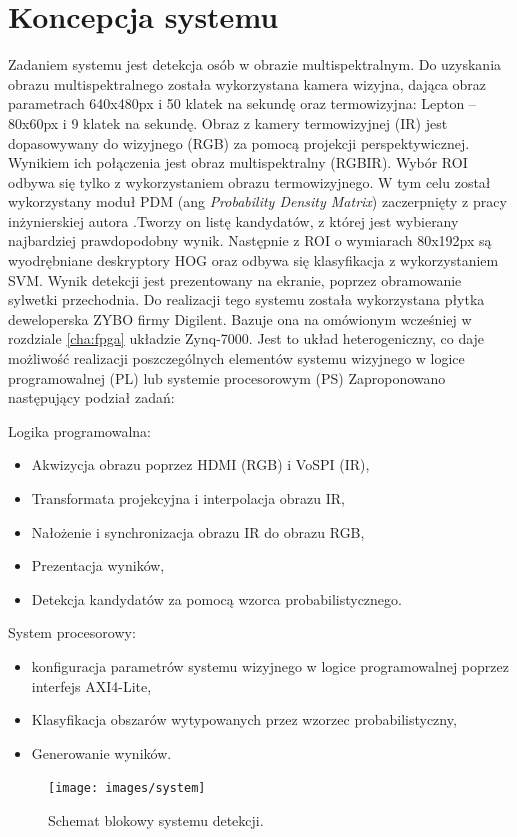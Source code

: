 \section{Koncepcja systemu}
Zadaniem systemu jest detekcja osób w obrazie multispektralnym. Do uzyskania obrazu multispektralnego została wykorzystana kamera wizyjna, dająca obraz parametrach 640x480px i 50 klatek na sekundę oraz termowizyjna: Lepton – 80x60px i 9 klatek na sekundę. Obraz z kamery termowizyjnej (IR) jest dopasowywany do wizyjnego (RGB) za pomocą projekcji perspektywicznej. Wynikiem ich połączenia jest obraz multispektralny (RGBIR). Wybór ROI odbywa się tylko z wykorzystaniem obrazu termowizyjnego. W tym celu został wykorzystany moduł PDM (ang \textit{Probability Density Matrix}) zaczerpnięty z pracy inżynierskiej autora \cite{kankaing}.Tworzy on listę kandydatów, z której jest wybierany najbardziej prawdopodobny wynik. Następnie z ROI o wymiarach 80x192px są wyodrębniane deskryptory HOG oraz odbywa się klasyfikacja z wykorzystaniem SVM. Wynik detekcji jest prezentowany na ekranie, poprzez obramowanie sylwetki przechodnia.
Do realizacji tego systemu została wykorzystana płytka deweloperska ZYBO firmy Digilent. Bazuje ona na omówionym wcześniej w rozdziale \ref{cha:fpga} układzie Zynq-7000. Jest to układ heterogeniczny, co daje możliwość realizacji poszczególnych elementów systemu wizyjnego w logice programowalnej (PL) lub systemie procesorowym (PS)
Zaproponowano następujący podział zadań:

Logika programowalna:
\begin{itemize}
\item Akwizycja obrazu poprzez HDMI (RGB) i VoSPI (IR),
\item Transformata projekcyjna i interpolacja obrazu IR,
\item Nałożenie i synchronizacja obrazu IR do obrazu RGB,
\item Prezentacja wyników,
\item Detekcja kandydatów za pomocą wzorca probabilistycznego.
\end{itemize}
System procesorowy:
\begin{itemize}
\item konfiguracja parametrów systemu wizyjnego w logice programowalnej poprzez interfejs AXI4-Lite,
\item Klasyfikacja obszarów wytypowanych przez wzorzec probabilistyczny,
\item Generowanie wyników.
\end{itemize}
\begin{figure}[h]
\centering
\texttt{[image: images/system]}
\caption{Schemat blokowy systemu detekcji.}
\label{fig:systemwizyjny}
\end{figure}

